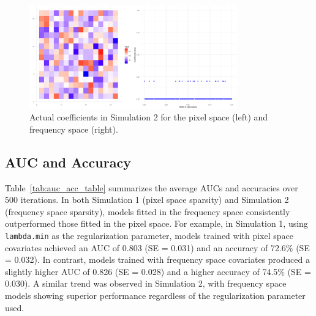 \documentclass[12pt]{article}
\begin{document}
\begin{figure}[H]
	\centering
	\includegraphics[width=0.8\textwidth, height=0.35\textwidth]{actual_coefs_sim2.png}
	\caption{Actual coefficients in Simulation 2 for the pixel space (left) and frequency space (right).}
	\label{fig:coefs_sim2}
\end{figure}

\FloatBarrier

\subsection*{AUC and Accuracy}

Table~\ref*{tab:auc_acc_table} summarizes the average AUCs and accuracies over 500 iterations. In both Simulation 1 (pixel space sparsity) and Simulation 2 (frequency space sparsity), models fitted in the frequency space consistently outperformed those fitted in the pixel space. For example, in Simulation 1, using \texttt{lambda.min} as the regularization parameter, models trained with pixel space covariates achieved an AUC of 0.803 (SE = 0.031) and an accuracy of 72.6\% (SE = 0.032). In contrast, models trained with frequency space covariates produced a slightly higher AUC of 0.826 (SE = 0.028) and a higher accuracy of 74.5\% (SE = 0.030). A similar trend was observed in Simulation 2, with frequency space models showing superior performance regardless of the regularization parameter used.
\end{document}
